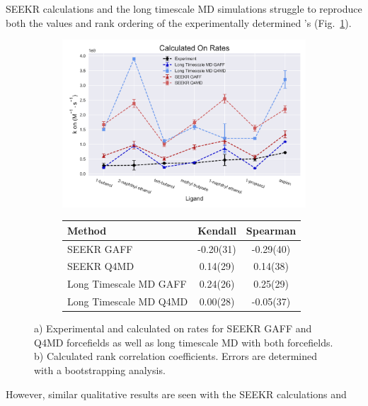 \par SEEKR calculations and the long timescale MD simulations struggle to
reproduce both the values and rank ordering of the experimentally determined \kon's (Fig.~\ref{fig:on_scatter}).
\begin{figure}
	\begin{subfigure}{\linewidth}
	\includegraphics{images/on_scatter_resize.png}
	\caption{}
	\end{subfigure}

	\bigskip

	\begin{subfigure}{\linewidth}%
    \begin{tabular}{
l  S[table-format = 2.3(3), separate-uncertainty]
  S[table-format = 2.3(3), separate-uncertainty]
 }%

\textbf{Method} & \textbf{Kendall} & \textbf{Spearman}  \\
\hline
      SEEKR GAFF      &    -0.20(31)           &    -0.29(40)            \\
      SEEKR Q4MD      &    0.14(29)           &    0.14(38)             \\
      Long Timescale MD GAFF      &    0.24(26)           &    0.25(29)                     \\
      Long Timescale MD Q4MD      &    0.00(28)           &    -0.05(37)                     \\


    \end{tabular}
        \caption{}
	\end{subfigure}
	\caption{a) Experimental and calculated on rates for SEEKR GAFF and Q4MD forcefields as well as long timescale MD with both forcefields. b) Calculated rank correlation coefficients. Errors are determined with a bootstrapping analysis. }
  \label{fig:on_scatter}
  \end{figure} However, similar qualitative results are seen with the SEEKR calculations and
